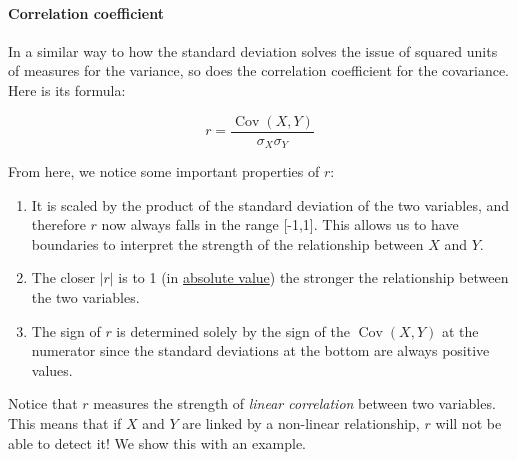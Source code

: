 \documentclass[
  letterpaper,
  DIV=11,
  numbers=noendperiod]{scrartcl}
\let\oldparagraph\paragraph
\renewcommand{\paragraph}[1]{\oldparagraph{#1}\mbox{}}
\providecommand{\tightlist}{%
  \setlength{\itemsep}{0pt}\setlength{\parskip}{0pt}}\usepackage{longtable,booktabs,array}
\begin{document}
\paragraph{Correlation coefficient}\label{correlation-coefficient}

In a similar way to how the standard deviation solves the issue of
squared units of measures for the variance, so does the correlation
coefficient for the covariance. Here is its formula:

\[
r = \frac{\operatorname{Cov}(X, Y)}{\sigma_X \sigma_Y}
\]

From here, we notice some important properties of \(r\):

\begin{enumerate}
\def\labelenumi{\arabic{enumi}.}
\tightlist
\item
  It is scaled by the product of the standard deviation of the two
  variables, and therefore \(r\) now always falls in the range
  {[}-1,1{]}. This allows us to have boundaries to interpret the
  strength of the relationship between \(X\) and \(Y\).
\item
  The closer \(|r|\) is to 1 (in
  \href{https://en.wikipedia.org/wiki/Absolute_value}{absolute value})
  the stronger the relationship between the two variables.
\item
  The sign of \(r\) is determined solely by the sign of the
  \(\operatorname{Cov}(X, Y)\) at the numerator since the standard
  deviations at the bottom are always positive values.
\end{enumerate}

\begin{tcolorbox}[enhanced jigsaw, bottomrule=.15mm, colframe=quarto-callout-important-color-frame, arc=.35mm, leftrule=.75mm, toptitle=1mm, toprule=.15mm, titlerule=0mm, breakable, opacityback=0, colbacktitle=quarto-callout-important-color!10!white, coltitle=black, bottomtitle=1mm, colback=white, title=\textcolor{quarto-callout-important-color}{\faExclamation}\hspace{0.5em}{Important}, left=2mm, rightrule=.15mm, opacitybacktitle=0.6]

Notice that \(r\) measures the strength of \emph{linear correlation}
between two variables. This means that if \(X\) and \(Y\) are linked by
a non-linear relationship, \(r\) will not be able to detect it! We show
this with an example.

\end{tcolorbox}
\end{document}
